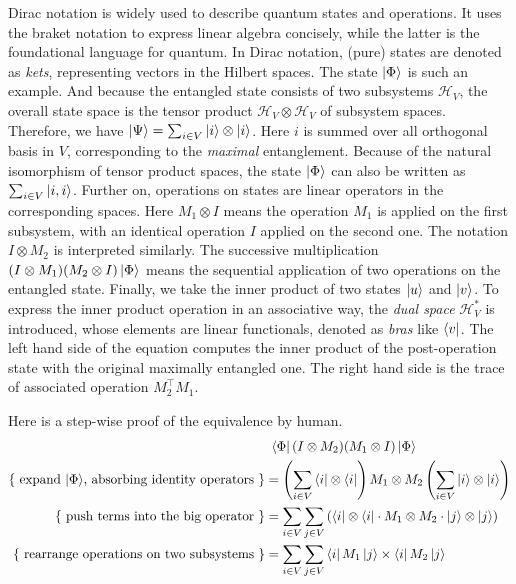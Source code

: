 \documentclass[manuscript, review, timestamp]{acmart}
\begin{document}
Dirac notation is widely used to describe quantum states and operations. It uses the braket notation to express linear algebra concisely, while the latter is the foundational language for quantum.
In Dirac notation, (pure) states are denoted as \textit{kets}, representing vectors in the Hilbert spaces. The state $\ket{\Phi}$ is such an example. And because the entangled state consists of two subsystems $\mathcal{H}_V$, the overall state space is the tensor product $\mathcal{H}_V \otimes \mathcal{H}_V$ of subsystem spaces.
Therefore, we have $\ket{\Psi} = \sum_{i\in V} \ket{i} \otimes \ket{i}$. Here $i$ is summed over all orthogonal basis in $V$, corresponding to the \textit{maximal} entanglement. Because of the natural isomorphism of tensor product spaces, the state $\ket{\Phi}$ can also be written as $\sum_{i \in V} \ket{i, i}$. 
Further on, operations on states are linear operators in the corresponding spaces. Here $M_1 \otimes I$ means the operation $M_1$ is applied on the first subsystem, with an identical operation $I$ applied on the second one. The notation $I \otimes M_2$ is interpreted similarly. The successive multiplication $(I\otimes M_1)(M_2 \otimes I)\ket{\Phi}$ means the sequential application of two operations on the entangled state.
Finally, we take the inner product of two states $\ket{u}$ and $\ket{v}$. To express the inner product operation in an associative way, the \textit{dual space} $\mathcal{H}_V^*$ is introduced, whose elements are linear functionals, denoted as \textit{bras} like $\bra{v}$. The left hand side of the equation computes the inner product of the post-operation state with the original maximally entangled one. The right hand side is the trace of associated operation $M_2^\top M_1$.

Here is a step-wise proof of the equivalence by human.
\begin{align}
    & \ \bra{\Phi} (I \otimes M_2) (M_1 \otimes I) \ket{\Phi} \notag \\
    \text{\{ expand $\ket{\Phi}$, absorbing identity operators \}} & = \left(\sum_{i\in V} \bra{i} \otimes \bra{i}\right) M_1 \otimes M_2 \left(\sum_{i \in V} \ket{i} \otimes \ket{i}\right) \\
    \text{\{ push terms into the big operator \}} & = \sum_{i\in V} \sum_{j \in V} \left( \bra{i} \otimes \bra{i} \cdot  M_1 \otimes M_2 \cdot \ket{j} \otimes \ket{j} \right) \\
    \text{\{ rearrange operations on two subsystems \}} & = \sum_{i\in V} \sum_{j \in V} \bra{i} M_1 \ket{j} \times \bra{i} M_2 \ket{j}
\end{align}
\end{document}
